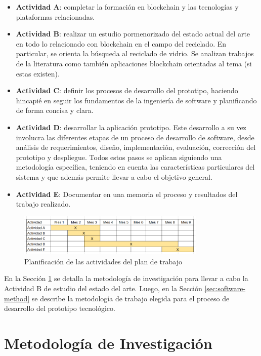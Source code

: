 \begin{itemize}
	\item \textbf{Actividad A}: completar la formación en blockchain y las tecnologías y plataformas relacionadas.
	\item \textbf{Actividad B}: realizar un estudio pormenorizado del estado actual del arte en todo lo relacionado con blockchain en el campo del reciclado. En particular, se orienta la búsqueda al reciclado de vidrio. Se analizan trabajos de la literatura como también aplicaciones blockchain orientadas al tema (si estas existen).
	\item \textbf{Actividad C}: definir los procesos de desarrollo del prototipo, haciendo hincapié en seguir los fundamentos de la ingeniería de software y planificando de forma concisa y clara.
	\item \textbf{Actividad D}: desarrollar la aplicación prototipo. Este desarrollo a su vez involucra las diferentes etapas de un proceso de desarrollo de software, desde análisis de requerimientos, diseño, implementación, evaluación, corrección del prototipo y despliegue. Todos estos pasos se aplican siguiendo una metodología específica, teniendo en cuenta las características particulares del sistema y que además permite llevar a cabo el objetivo general.
	\item \textbf{Actividad E}: Documentar en una memoria el proceso y resultados del trabajo realizado.
\end{itemize}

\begin{figure}[!htpb]
    \centering
    \includegraphics[width=0.8\textwidth]{Figures/activities-plan.png}
    \caption{Planificación de las actividades del plan de trabajo}
    \label{fig:activities-plan}
\end{figure}

En la Sección \ref{sec:research-method} se detalla la metodología de investigación para llevar a cabo la Actividad B de estudio del estado del arte. Luego, en la Sección \ref{sec:software-method} se describe la metodología de trabajo elegida para el proceso de desarrollo del prototipo tecnológico.

\section{Metodología de Investigación}
\label{sec:research-method}

